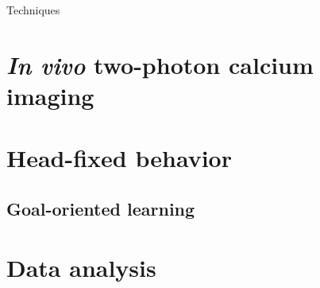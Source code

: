 Techniques

\section{\emph{In vivo} two-photon calcium imaging}

\section{Head-fixed behavior}

\subsection{Goal-oriented learning}

\section{Data analysis}